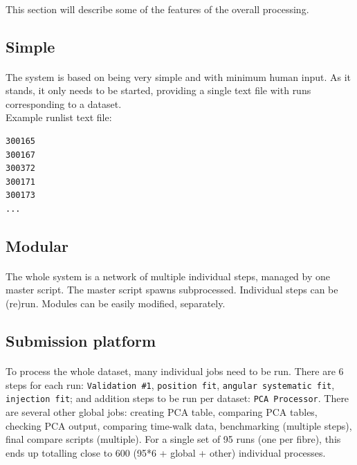 \documentclass[12pt]{article}
\begin{document}
\paragraph{}
This section will describe some of the features of the overall processing.

\subsection{Simple}
\paragraph{}
The system is based on being very simple and with minimum human input. As it stands, it only needs to be started, providing a single text file with runs corresponding to a dataset.\\
Example runlist text file:
\begin{lstlisting}
300165
300167
300372
300171
300173
...
\end{lstlisting}

\subsection{Modular}
\paragraph{}
The whole system is a network of multiple individual steps, managed by one master script. The master script spawns subprocessed. Individual steps can be (re)run. Modules can be easily modified, separately.

\subsection{Submission platform}
\paragraph{}
To process the whole dataset, many individual jobs need to be run. There are 6 steps for each run: \texttt{Validation \#1}, \texttt{position fit}, \texttt{angular systematic fit}, \texttt{injection fit}; and addition steps to be run per dataset: \texttt{PCA Processor}. There are several other global jobs: creating PCA table, comparing PCA tables, checking PCA output, comparing time-walk data, benchmarking (multiple steps), final compare scripts (multiple). For a single set of 95 runs (one per fibre), this ends up totalling close to 600 (95*6 + global + other) individual processes.
\end{document}
